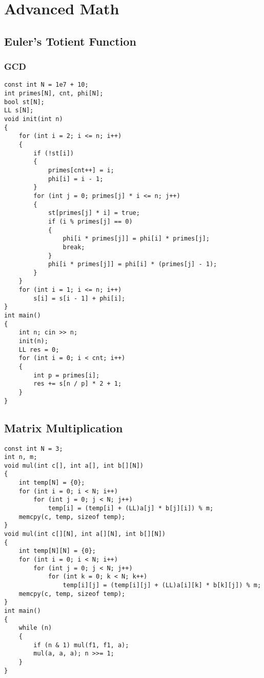 \chapter{Advanced Math}\label{chap:AdvancedMath}
\section{Euler's Totient Function}
\subsection{GCD}
\begin{lstlisting}
const int N = 1e7 + 10;
int primes[N], cnt, phi[N];
bool st[N];
LL s[N];
void init(int n)
{
    for (int i = 2; i <= n; i++)
    {
        if (!st[i])
        {
            primes[cnt++] = i;
            phi[i] = i - 1;
        }
        for (int j = 0; primes[j] * i <= n; j++)
        {
            st[primes[j] * i] = true;
            if (i % primes[j] == 0)
            {
                phi[i * primes[j]] = phi[i] * primes[j];
                break;
            }
            phi[i * primes[j]] = phi[i] * (primes[j] - 1);
        }
    }
    for (int i = 1; i <= n; i++)
        s[i] = s[i - 1] + phi[i];
}
int main()
{
    int n; cin >> n;
    init(n);
    LL res = 0;
    for (int i = 0; i < cnt; i++)
    {
        int p = primes[i];
        res += s[n / p] * 2 + 1;
    }
}
\end{lstlisting}
\section{Matrix Multiplication}
\begin{lstlisting}
const int N = 3;
int n, m;
void mul(int c[], int a[], int b[][N])
{
    int temp[N] = {0};
    for (int i = 0; i < N; i++)
        for (int j = 0; j < N; j++)
            temp[i] = (temp[i] + (LL)a[j] * b[j][i]) % m;
    memcpy(c, temp, sizeof temp);
}
void mul(int c[][N], int a[][N], int b[][N])
{
    int temp[N][N] = {0};
    for (int i = 0; i < N; i++)
        for (int j = 0; j < N; j++)
            for (int k = 0; k < N; k++)
                temp[i][j] = (temp[i][j] + (LL)a[i][k] * b[k][j]) % m;
    memcpy(c, temp, sizeof temp);
}
int main()
{
    while (n)
    {
        if (n & 1) mul(f1, f1, a);
        mul(a, a, a); n >>= 1;
    }
}
\end{lstlisting}
